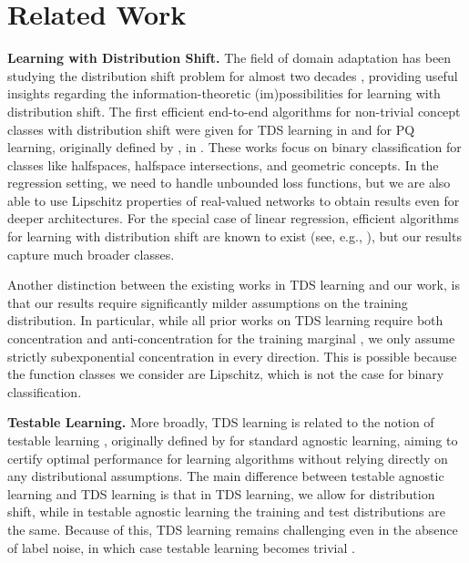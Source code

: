 \section{Related Work}
\noindent\textbf{Learning with Distribution Shift.} The field of domain adaptation has been studying the distribution shift problem for almost two decades \cite{ben2006analysis,blitzer2007learning,ben2010theory,mansour2009domadapt,david2010impossibility,mousavi2020minimax,redko2020survey,kalavasis2024transfer,hanneke2019value,hanneke2024more,awasthi2024best}, providing useful insights regarding the information-theoretic (im)possibilities for learning with distribution shift. The first efficient end-to-end algorithms for non-trivial concept classes with distribution shift were given for TDS learning in \cite{klivans2023testable,klivans2024learning,chandrasekaran2024efficient} and for PQ learning, originally defined by \cite{goldwasser2020beyond}, in \cite{goel2024tolerant}. These works focus on binary classification for classes like halfspaces, halfspace intersections, and geometric concepts. In the regression setting, we need to handle unbounded loss functions, but we are also able to use Lipschitz properties of real-valued networks to obtain results even for deeper architectures. For the special case of linear regression, efficient algorithms for learning with distribution shift are known to exist (see, e.g., \cite{lei2021near}), but our results capture much broader classes. 

Another distinction between the existing works in TDS learning and our work, is that our results require significantly milder assumptions on the training distribution. In particular, while all prior works on TDS learning require both concentration and anti-concentration for the training marginal \cite{klivans2023testable,klivans2024learning,chandrasekaran2024efficient}, we only assume strictly subexponential concentration in every direction. This is possible because the function classes we consider are Lipschitz, which is not the case for binary classification.

\noindent\textbf{Testable Learning.} More broadly, TDS learning is related to the notion of testable learning \cite{rubinfeld2022testing,gollakota2022moment,gollakota2023efficient,diakonikolas2023efficient,gollakota2024tester,diakonikolas2024testable,slot2024testably}, originally defined by \cite{rubinfeld2022testing} for standard agnostic learning, aiming to certify optimal performance for learning algorithms without relying directly on any distributional assumptions. The main difference between testable agnostic learning and TDS learning is that in TDS learning, we allow for distribution shift, while in testable agnostic learning the training and test distributions are the same. Because of this, TDS learning remains challenging even in the absence of label noise, in which case testable learning becomes trivial \cite{klivans2023testable}.


